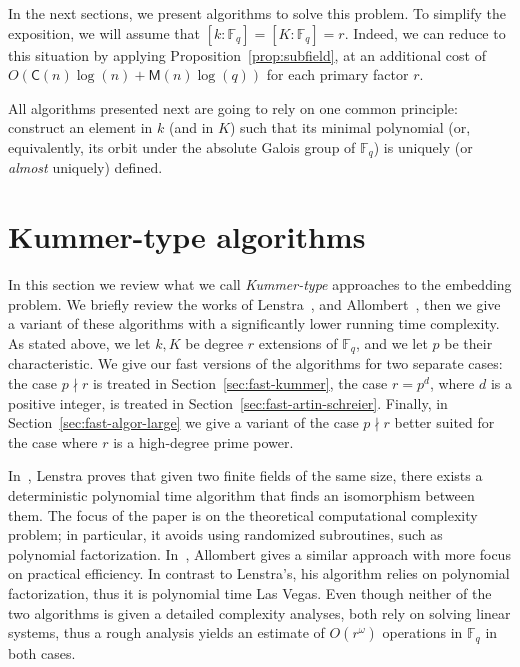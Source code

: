 \documentclass[12pt]{article}
\theoremstyle{plain}
\theoremstyle{definition}
\def\F{\ensuremath{\mathbb{F}}}
\def\MM{\ensuremath{\mathsf{M}}}
\def\CC{\ensuremath{\mathsf{C}}}
\newcounter{algorithm}
\begin{document}
In the next sections, we present algorithms to solve this problem. To
simplify the exposition, we will assume that $[k:\F_q]=[K:\F_q]=r$.
Indeed, we can reduce to this situation by applying
Proposition~\ref{prop:subfield}, at an additional cost of
$O(\CC(n)\log(n) + \MM(n)\log(q))$ for each primary factor $r$.

All algorithms presented next are going to rely on one common
principle: construct an element in $k$ (and in $K$) such that its
minimal polynomial (or, equivalently, its orbit under the absolute
Galois group of $\F_q$) is uniquely (or \emph{almost} uniquely)
defined.






\section{Kummer-type algorithms}
\label{sec:kummer}

In this section we review what we call \emph{Kummer-type} approaches to the embedding problem. 
We briefly review the works of Lenstra~\cite{LenstraJr91}, and Allombert~\cite{Allombert02}, then 
we give a variant of these algorithms with a significantly lower running time complexity.
As stated above, we let $k,K$ be degree $r$ extensions of $\F_q$, and we let $p$ be their
characteristic.
We give our fast versions of the algorithms for two separate cases: the case $p \nmid r$
is treated in Section~\ref{sec:fast-kummer}, the case $r = p^d$, where $d$ 
is a positive integer, is treated in Section~\ref{sec:fast-artin-schreier}.
Finally, in Section~\ref{sec:fast-algor-large} we give a variant of the case
$p \nmid r$ better suited for the case where $r$ is a high-degree prime power.

In~\cite{LenstraJr91}, Lenstra proves that 
given two finite fields of the same size, there exists a deterministic polynomial time algorithm 
that finds an isomorphism between them. The focus of the paper is on the theoretical computational
complexity problem; in particular, it avoids using randomized subroutines, such as polynomial
factorization. 
In~\cite{Allombert02}, Allombert gives a similar approach with more focus on practical efficiency.
In contrast to Lenstra's, his algorithm relies on polynomial factorization, thus it is
polynomial time Las Vegas.
Even though neither of the two algorithms is given a detailed complexity analyses, both rely
on solving linear systems, thus a rough analysis yields an estimate of $O(r^{\omega})$ operations
in $\F_q$ in both cases.
\end{document}
